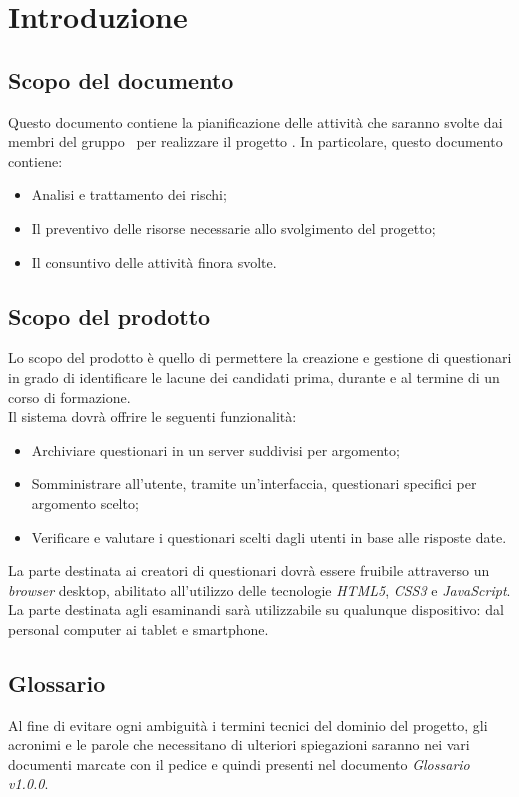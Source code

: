 \section{Introduzione}
\subsection{Scopo del documento}
Questo documento contiene la pianificazione delle attività che saranno svolte dai membri del gruppo \gruppo\ per realizzare il progetto \progetto. In particolare, questo documento contiene:

	\begin{itemize}
		\item Analisi e trattamento dei rischi;
		\item Il preventivo delle risorse necessarie allo svolgimento del progetto;
		\item Il consuntivo delle attività finora svolte.
	\end{itemize}
	
\subsection{Scopo del prodotto}
Lo scopo del prodotto è quello di permettere la creazione e gestione di questionari in grado di identificare le lacune dei candidati prima, durante e al termine di un corso di formazione. 
\\Il sistema dovrà offrire le seguenti funzionalità:
\begin{itemize}
	\item
	Archiviare questionari in un server suddivisi per argomento;
	\item
	Somministrare all'utente, tramite un'interfaccia, questionari specifici per argomento scelto;
	\item
	Verificare e valutare i questionari scelti dagli utenti in base alle risposte date.
\end{itemize}
La parte destinata ai creatori di questionari dovrà essere fruibile attraverso un \textit{browser} desktop, abilitato all'utilizzo delle tecnologie \textit{HTML5}, \textit{CSS3} e \textit{JavaScript}. La parte destinata agli esaminandi sarà utilizzabile su qualunque dispositivo: dal personal computer ai tablet e smartphone.

\subsection{Glossario}
Al fine di evitare ogni ambiguità i termini tecnici del dominio del progetto, gli acronimi e le parole che necessitano di ulteriori spiegazioni saranno nei vari documenti marcate con il pedice  e quindi presenti nel documento \textit{Glossario v1.0.0}.
